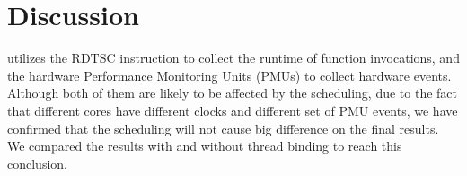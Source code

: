 \section{Discussion}
\label{sec:limitation}
\MP{} utilizes the RDTSC instruction to collect the runtime of function invocations, and the hardware Performance Monitoring Units (PMUs) to collect hardware events. Although both of them are likely to be affected by the scheduling, due to the fact that different cores have different clocks and different set of PMU events, we have confirmed that the scheduling will not cause big difference on the final results. We compared the results with and without thread binding to reach this conclusion. 


